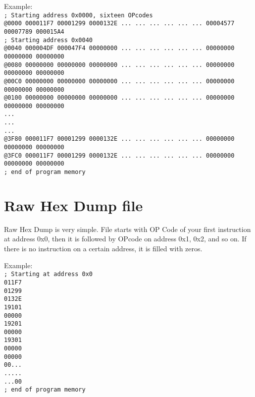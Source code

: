     Example:\\
    {
        \usecodefont
        \verb'; Starting address 0x0000, sixteen OPcodes'\\
        \verb'@0000 000011F7 00001299 0000132E ... ... ... ... ... ... 00004577 00007789 000015A4'\\
        \verb'; Starting address 0x0040'\\
        \verb'@0040 000004DF 000047F4 00000000 ... ... ... ... ... ... 00000000 00000000 00000000'\\
        \verb'@0080 00000000 00000000 00000000 ... ... ... ... ... ... 00000000 00000000 00000000'\\
        \verb'@00C0 00000000 00000000 00000000 ... ... ... ... ... ... 00000000 00000000 00000000'\\
        \verb'@0100 00000000 00000000 00000000 ... ... ... ... ... ... 00000000 00000000 00000000'\\
        \verb'...'\\
        \verb'...'\\
        \verb'...'\\
        \verb'@3F80 000011F7 00001299 0000132E ... ... ... ... ... ... 00000000 00000000 00000000'\\
        \verb'@3FC0 000011F7 00001299 0000132E ... ... ... ... ... ... 00000000 00000000 00000000'\\
        \verb'; end of program memory'\\
    }

\section{Raw Hex Dump file}
    Raw Hex Dump is very simple. File starts with OP Code of your first instruction at address 0x0, then it is followed by OPcode on address 0x1, 0x2, and so on. If there is no instruction on a certain address, it is filled with zeros.

    Example:\\
    {
        \usecodefont
        \verb'; Starting at address 0x0'\\
        \verb'011F7'\\
        \verb'01299'\\
        \verb'0132E'\\
        \verb'19101'\\
        \verb'00000'\\
        \verb'19201'\\
        \verb'00000'\\
        \verb'19301'\\
        \verb'00000'\\
        \verb'00000'\\
        \verb'00...'\\
        \verb'.....'\\
        \verb'...00'\\
        \verb'; end of program memory'\\
    }

